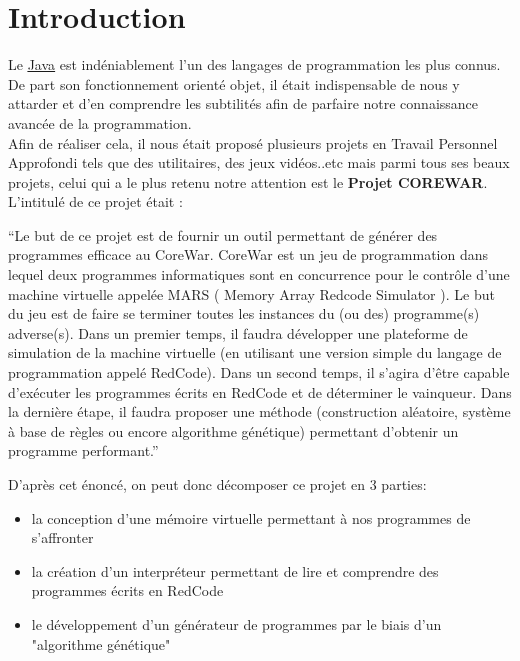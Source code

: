 \documentclass[a4paper,12pt]{article}
\begin{document}
\section{Introduction}
Le \href{https://docs.oracle.com/javase/7/docs/api/}{\underline{Java}} est indéniablement l'un des langages de programmation les plus connus.\\
De part son fonctionnement orienté objet, il était indispensable de nous y attarder et d'en comprendre les subtilités afin de parfaire notre connaissance avancée de la programmation.\\
\indent Afin de réaliser cela, il nous était proposé plusieurs projets en Travail Personnel Approfondi tels que des utilitaires, des jeux vidéos..etc mais parmi tous ses beaux projets, celui qui a le plus retenu notre attention est le \textbf{Projet COREWAR}.\\
L'intitulé de ce projet était :\\
\begin{center}
\enquote{Le but de ce projet est de fournir un outil permettant de générer des programmes efficace au CoreWar. CoreWar est un jeu de programmation dans lequel deux programmes informatiques sont en concurrence pour le contrôle d'une machine virtuelle appelée MARS ( Memory Array Redcode Simulator ). Le but du jeu est de faire se terminer toutes les instances du (ou des) programme(s) adverse(s). Dans un premier temps, il faudra développer une plateforme de simulation de la machine virtuelle (en utilisant une version simple du langage de programmation appelé RedCode).
Dans un second temps, il s'agira d’être capable d’exécuter les programmes écrits en RedCode et de déterminer le vainqueur. Dans la dernière étape, il faudra proposer une méthode (construction
aléatoire, système à base de règles ou encore algorithme génétique) permettant d'obtenir un programme performant.}
\end{center}
\bigbreak
D'après cet énoncé, on peut donc décomposer ce projet en 3 parties:
\begin{center}
\begin{itemize}[label=\textbullet, font=\LARGE]
\item la conception d'une mémoire virtuelle permettant à nos programmes de s'affronter
\item la création d'un interpréteur permettant de lire et comprendre des programmes écrits en RedCode
\item le développement d'un générateur de programmes par le biais d'un "algorithme génétique"
\end{itemize}
\end{center}
\pagebreak
\end{document}
